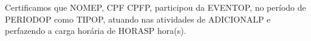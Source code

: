 Certificamos que NOMEP, CPF CPFP, participou da EVENTOP, no período de PERIODOP como TIPOP, atuando nas atividades de ADICIONALP e perfazendo a carga horária de HORASP hora(s).
